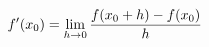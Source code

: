 \documentclass[preview]{standalone}
\begin{document}
\begin{align*}
\special{dvisvgm:raw <g id='unique000'>}f'(x_0) = \lim_{{h \to 0}} \frac{f(x_0 + h) - f(x_0)}{h}\special{dvisvgm:raw </g>}
\end{align*}
\end{document}
